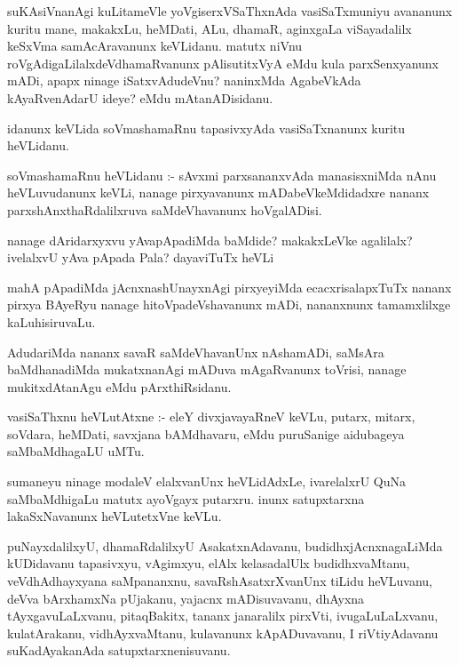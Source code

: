 \documentclass{article}
\begin{document}
\begin{mn}
suKAsiVnanAgi kuLitameVle yoVgiserxVSaThxnAda vasiSaTxmuniyu avananunx kuritu 
mane, makakxLu, heMDati, ALu, dhamaR, aginxgaLa viSayadalilx keSxVma 
samAcAravanunx keVLidanu. matutx niVnu roVgAdigaLilalxdeVdhamaRvanunx pAlisutitxVyA 
eMdu kula parxSenxyanunx mADi, apapx ninage iSatxvAdudeVnu? naninxMda AgabeVkAda 
kAyaRvenAdarU ideye? eMdu mAtanADisidanu.
\end{mn}

\begin{mn}
idanunx keVLida soVmashamaRnu tapasivxyAda vasiSaTxnanunx kuritu heVLidanu.
\end{mn}

\begin{mn}
soVmashamaRnu heVLidanu :- sAvxmi parxsananxvAda manasisxniMda nAnu heVLuvudanunx keVLi, 
nanage pirxyavanunx mADabeVkeMdidadxre nananx parxshAnxthaRdalilxruva saMdeVhavanunx hoVgalADisi.
\end{mn}

\begin{mn}
nanage dAridarxyxvu yAvapApadiMda baMdide? makakxLeVke agalilalx? ivelalxvU 
yAva pApada Pala? dayaviTuTx heVLi
\end{mn}

\begin{mn}
mahA pApadiMda jAcnxnashUnayxnAgi pirxyeyiMda ecacxrisalapxTuTx nananx pirxya 
BAyeRyu nanage hitoVpadeVshavanunx mADi, nananxnunx tamamxlilxge kaLuhisiruvaLu.
\end{mn}

\begin{mn}
AdudariMda nananx savaR saMdeVhavanUnx nAshamADi, saMsAra baMdhanadiMda 
mukatxnanAgi mADuva mAgaRvanunx toVrisi, nanage mukitxdAtanAgu eMdu pArxthiRsidanu.
\end{mn}

\begin{mn}
vasiSaThxnu heVLutAtxne :- eleY divxjavayaRneV  keVLu,  putarx, mitarx, 
soVdara, heMDati, savxjana bAMdhavaru, eMdu puruSanige aidubageya saMbaMdhagaLU uMTu.
\end{mn}

\begin{mn}
sumaneyu ninage modaleV elalxvanUnx heVLidAdxLe, ivarelalxrU QuNa saMbaMdhigaLu 
matutx ayoVgayx putarxru. inunx satupxtarxna lakaSxNavanunx heVLutetxVne keVLu.
\end{mn}

\begin{mn}
puNayxdalilxyU, dhamaRdalilxyU AsakatxnAdavanu, budidhxjAcnxnagaLiMda 
kUDidavanu tapasivxyu, vAgimxyu, elAlx kelasadalUlx budidhxvaMtanu, 
veVdhAdhayxyana saMpananxnu, savaRshAsatxrXvanUnx tiLidu heVLuvanu, deVva 
bArxhamxNa pUjakanu, yajacnx mADisuvavanu, dhAyxna tAyxgavuLaLxvanu, pitaqBakitx, 
tananx janaralilx pirxVti, ivugaLuLaLxvanu, kulatArakanu, vidhAyxvaMtanu, 
kulavanunx kApADuvavanu, I riVtiyAdavanu suKadAyakanAda satupxtarxnenisuvanu.
\end{mn}
\end{document}
